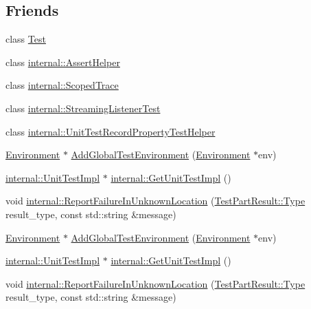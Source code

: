 \subsection*{Friends}
\begin{DoxyCompactItemize}
\item 
class \hyperlink{classtesting_1_1_unit_test_ab085d1bf4cff8b1045750706b11f8662}{Test}
\item 
class \hyperlink{classtesting_1_1_unit_test_a7375bdc46f0244d0011c2d15ee160473}{internal\-::\-Assert\-Helper}
\item 
class \hyperlink{classtesting_1_1_unit_test_ac93c943076897e55055643c28d06415d}{internal\-::\-Scoped\-Trace}
\item 
class \hyperlink{classtesting_1_1_unit_test_a2021083660b7387a257fb6c6242fee73}{internal\-::\-Streaming\-Listener\-Test}
\item 
class \hyperlink{classtesting_1_1_unit_test_a4eaca072927111aedfecd9787cebbbcc}{internal\-::\-Unit\-Test\-Record\-Property\-Test\-Helper}
\item 
\hyperlink{classtesting_1_1_environment}{Environment} $\ast$ \hyperlink{classtesting_1_1_unit_test_a5ec26e4c31220ff8e769cc09689a4d6d}{Add\-Global\-Test\-Environment} (\hyperlink{classtesting_1_1_environment}{Environment} $\ast$env)
\item 
\hyperlink{classtesting_1_1internal_1_1_unit_test_impl}{internal\-::\-Unit\-Test\-Impl} $\ast$ \hyperlink{classtesting_1_1_unit_test_a56e56be7066957d612e53b5c60f6ac08}{internal\-::\-Get\-Unit\-Test\-Impl} ()
\item 
void \hyperlink{classtesting_1_1_unit_test_a73f5a158c13793b90c80d854c9a75120}{internal\-::\-Report\-Failure\-In\-Unknown\-Location} (\hyperlink{classtesting_1_1_test_part_result_a65ae656b33fdfdfffaf34858778a52d5}{Test\-Part\-Result\-::\-Type} result\-\_\-type, const std\-::string \&message)
\item 
\hyperlink{classtesting_1_1_environment}{Environment} $\ast$ \hyperlink{classtesting_1_1_unit_test_a5ec26e4c31220ff8e769cc09689a4d6d}{Add\-Global\-Test\-Environment} (\hyperlink{classtesting_1_1_environment}{Environment} $\ast$env)
\item 
\hyperlink{classtesting_1_1internal_1_1_unit_test_impl}{internal\-::\-Unit\-Test\-Impl} $\ast$ \hyperlink{classtesting_1_1_unit_test_a56e56be7066957d612e53b5c60f6ac08}{internal\-::\-Get\-Unit\-Test\-Impl} ()
\item 
void \hyperlink{classtesting_1_1_unit_test_a73f5a158c13793b90c80d854c9a75120}{internal\-::\-Report\-Failure\-In\-Unknown\-Location} (\hyperlink{classtesting_1_1_test_part_result_a65ae656b33fdfdfffaf34858778a52d5}{Test\-Part\-Result\-::\-Type} result\-\_\-type, const std\-::string \&message)
\end{DoxyCompactItemize}



